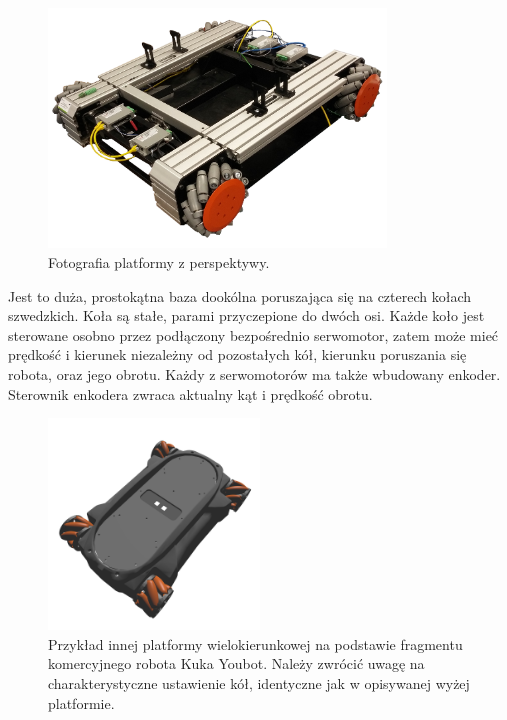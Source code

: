 \begin{figure}[H]
\centering
 \includegraphics[width=0.8\textwidth]{graphics/base_photo.png}
\caption{Fotografia platformy z perspektywy.}
\end{figure} 

Jest to duża, prostokątna baza dookólna poruszająca się na czterech kołach szwedzkich.
Koła są stałe, parami przyczepione do dwóch osi.
Każde koło jest sterowane osobno przez podłączony bezpośrednio serwomotor, zatem może mieć prędkość i kierunek niezależny od pozostałych kół, kierunku poruszania się robota, oraz jego obrotu.
Każdy z serwomotorów ma także wbudowany enkoder.
Sterownik enkodera zwraca aktualny kąt i prędkość obrotu.

\begin{figure}[H]
\centering
 \includegraphics[width=0.5\textwidth]{graphics/kuka_youbot.png}
\caption{Przykład innej platformy wielokierunkowej na podstawie fragmentu komercyjnego robota Kuka Youbot. Należy zwrócić uwagę na charakterystyczne ustawienie kół, identyczne jak w opisywanej wyżej platformie.}
\end{figure} 

